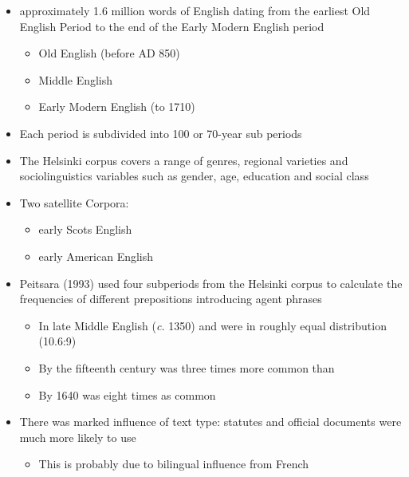 \documentclass[a4paper,landscape,headrule,footrule,xetex]{foils}
\begin{document}
\begin{itemize}
\item approximately 1.6 million words of English dating from the earliest Old English Period to the end of the Early Modern English period 
  \begin{itemize}
  \item Old English (before AD 850)
  \item Middle English
  \item Early Modern English (to 1710)
  \end{itemize}
\item Each period is subdivided into  100 or 70-year sub periods
\item The Helsinki corpus covers a range of genres, regional varieties and sociolinguistics variables such as gender, age, education and social class
\item Two satellite Corpora:
  \begin{itemize}
  \item early Scots English
  \item early American English
  \end{itemize}
\end{itemize}  



\begin{itemize}
\item  Peitsara (1993) used four subperiods from the Helsinki corpus to calculate the frequencies of different prepositions introducing agent phrases
  \begin{itemize}
  \item In late Middle English (\textit{c.} 1350)  and
     were in roughly equal distribution (10.6:9)
  \item By the fifteenth century  was three times more
    common than 
  \item By 1640  was eight times as common
  \end{itemize}
\item There was marked influence of text type: statutes and official
  documents were much more likely to use 
  \begin{itemize}
  \item This is probably due to bilingual influence from French
  \end{itemize}
\end{itemize}
\end{document}
